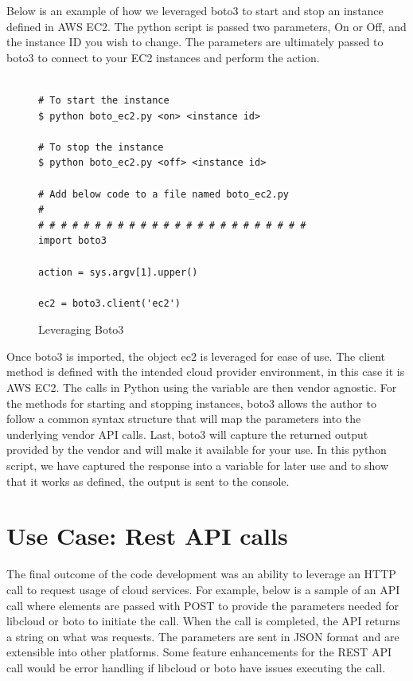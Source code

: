 Below is an example of how we leveraged boto3 to start and stop an instance
defined in AWS EC2. The python script is passed two parameters, On or Off, and
the instance ID you wish to change. The parameters are ultimately passed to
boto3 to connect to your EC2 instances and perform the action.

\begin{figure}[htb]
\begin{verbatim}

# To start the instance
$ python boto_ec2.py <on> <instance id>

# To stop the instance
$ python boto_ec2.py <off> <instance id>

# Add below code to a file named boto_ec2.py
# 
# # # # # # # # # # # # # # # # # # # # # # # # 
import boto3

action = sys.argv[1].upper()

ec2 = boto3.client('ec2')

\end{verbatim}

\caption{Leveraging Boto3~\cite{hid-sp18-518-Boto3}}\label{c:boto3-example}

\end{figure}

Once boto3 is imported, the object ec2 is leveraged for ease of use. The client
method is defined with the intended cloud provider environment, in this case it
is AWS EC2. The calls in Python using the variable are then vendor agnostic.
For
the methods for starting and stopping instances, boto3 allows the author to
follow a common syntax structure that will map the parameters into the
underlying vendor API calls. Last, boto3 will capture the returned output
provided by the vendor and will make it available for your use. In this python
script, we have captured the response into a variable for later use and to show
that it works as defined, the output is sent to the console.

\section{Use Case: Rest API calls}

The final outcome of the code development was an ability to leverage an HTTP
call to request usage of cloud services. For example, below is a sample of an
API call where elements are passed with POST to provide the parameters needed
for libcloud or boto to initiate the call. When the call is completed, the API
returns a string on what was requests. The parameters are sent in JSON format
and are extensible into other platforms. Some feature enhancements for the REST
API call would be error handling if libcloud or boto have issues executing the
call.  

